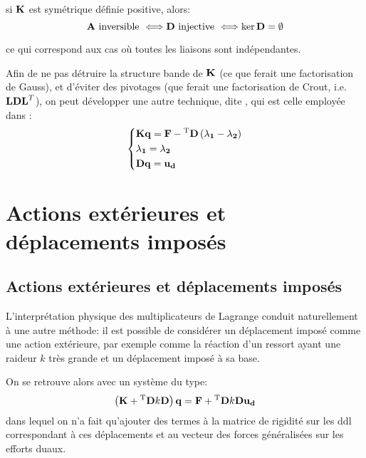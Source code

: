 \begin{theoreme}
si $\MM{K}$ est symétrique définie positive, alors:
\begin{equation}
\MM{A} \text{ inversible } \Longleftrightarrow \MM{D} \text{ injective } \Longleftrightarrow \ker \MM{D} = \emptyset
\end{equation}
\end{theoreme}
ce qui correspond aux cas où toutes les liaisons sont indépendantes.

\bigskipvm
Afin de ne pas détruire la structure bande de $\MM{K}$ (ce que ferait une factorisation de Gauss), 
et d'éviter des pivotages (que ferait une factorisation de Crout, i.e. $\MM{LDL}^T$), on peut développer une autre technique, dite , qui est celle employée dans \castem:
\begin{equation}
\left\{\begin{aligned}
&\MM{K}\VV{q} = \VV{F} - \MMT{D}\left(\VV{\lambda_1} - \VV{\lambda_2}\right) \\
&\VV{\lambda_1} = \VV{\lambda_2} \\ 
&\MM{D}\VV{q} = \VV{u_d}
\end{aligned}\right.
\end{equation}

\medskip
\ifVersionAvecExemplesSepares
   \section{Actions extérieures et déplacements imposés}
\else
   \subsection{Actions extérieures et déplacements imposés}
\fi

L'interprétation physique des multiplicateurs de Lagrange conduit naturellement à une autre méthode:
il est possible de considérer un déplacement imposé comme une action extérieure, par exemple comme
la réaction d'un ressort ayant une raideur $k$ très grande et un déplacement imposé à sa base.

\medskip
On se retrouve alors avec un système du type:
\begin{equation}
\left(\MM{K} + \MMT{D}k\MM{D}\right) \VV{q} = \VV{F} + \MMT{D}k\MM{D}\VV{u_d}
\end{equation}
dans lequel on n'a fait qu'ajouter des termes à la matrice de rigidité sur les ddl correspondant à ces
déplacements et au vecteur des forces généralisées sur les efforts duaux.

